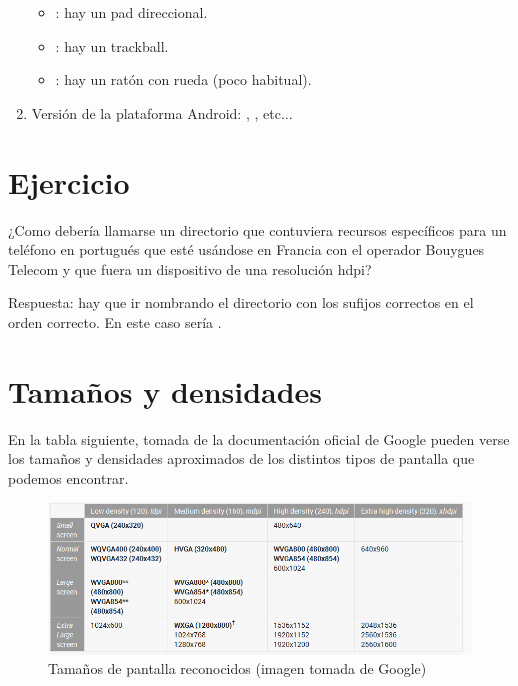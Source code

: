\documentclass[a4paper,12pt,spanish]{sphinxmanual}
\begin{document}
\begin{enumerate}
\begin{itemize}
\item {} 
: hay un pad direccional.

\item {} 
: hay un trackball.

\item {} 
:  hay un ratón con rueda (poco habitual).

\end{itemize}

\item {} 
Versión de la plataforma Android: , ,  etc...

\end{enumerate}


\section{Ejercicio}
\label{tema1:ejercicio}
¿Como debería llamarse un directorio que contuviera recursos específicos para un teléfono en portugués que esté usándose en Francia con el operador Bouygues Telecom y que fuera un dispositivo de una resolución hdpi?

Respuesta: hay que ir nombrando el directorio con los sufijos correctos en el orden correcto. En este caso sería .


\section{Tamaños y densidades}
\label{tema1:id3}
En la tabla siguiente, tomada de la documentación oficial de Google pueden verse los tamaños y densidades aproximados de los distintos tipos de pantalla que podemos encontrar.
\begin{figure}[htbp]
\centering
\capstart

\includegraphics{tamaniospantalla.png}
\caption{Tamaños de pantalla reconocidos (imagen tomada de Google)}\end{figure}
\end{document}
